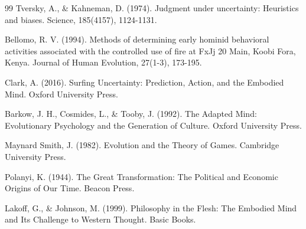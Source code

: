 \documentclass[12pt,a4paper]{article}
\begin{document}
\begin{thebibliography}{99}
Tversky, A., \& Kahneman, D. (1974). Judgment under uncertainty: Heuristics and biases. Science, 185(4157), 1124-1131.

Bellomo, R. V. (1994). Methods of determining early hominid behavioral activities associated with the controlled use of fire at FxJj 20 Main, Koobi Fora, Kenya. Journal of Human Evolution, 27(1-3), 173-195.

Clark, A. (2016). Surfing Uncertainty: Prediction, Action, and the Embodied Mind. Oxford University Press.

Barkow, J. H., Cosmides, L., \& Tooby, J. (1992). The Adapted Mind: Evolutionary Psychology and the Generation of Culture. Oxford University Press.

Maynard Smith, J. (1982). Evolution and the Theory of Games. Cambridge University Press.

Polanyi, K. (1944). The Great Transformation: The Political and Economic Origins of Our Time. Beacon Press.

Lakoff, G., \& Johnson, M. (1999). Philosophy in the Flesh: The Embodied Mind and Its Challenge to Western Thought. Basic Books.

\end{thebibliography}
\end{document}
